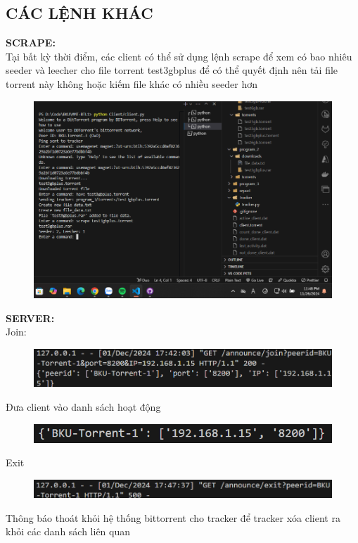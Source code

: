 \documentclass[a4paper]{article}
\begin{document}
\subsection{CÁC LỆNH KHÁC}
\noindent \textbf{SCRAPE:}\\
Tại bất kỳ thời điểm, các client có thể sử dụng lệnh scrape để xem có bao nhiêu seeder và leecher cho file torrent test3gbplus để có thể quyết định nên tải file torrent này không hoặc kiếm file khác có nhiều seeder hơn
\begin{figure}[H]
    \centering
    \includegraphics[width=1\textwidth]{images/39.png}
    \captionsetup{labelformat=empty}
\end{figure}
\noindent \textbf{SERVER:}\\
\indent Join:
\begin{figure}[H]
    \centering
    \includegraphics[width=1\textwidth]{images/36.png}
    \captionsetup{labelformat=empty}
\end{figure}
Đưa client vào danh sách hoạt động
\begin{figure}[H]
    \centering
    \includegraphics[width=1\textwidth]{images/37.png}
    \captionsetup{labelformat=empty}
\end{figure}
Exit
\begin{figure}[H]
    \centering
    \includegraphics[width=1\textwidth]{images/38.png}
    \captionsetup{labelformat=empty}
\end{figure}
Thông báo thoát khỏi hệ thống bittorrent cho tracker để tracker xóa client ra khỏi các danh sách liên quan	
\end{document}
